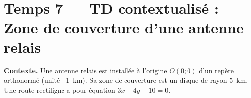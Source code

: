 
\section*{Temps 7 — TD contextualisé : Zone de couverture d'une antenne relais}

\textbf{Contexte.} Une antenne relais est installée à l'origine $O(0 ; 0)$ d'un repère orthonormé (unité : 1~km). Sa zone de couverture est un disque de rayon $5$~km. Une route rectiligne a pour équation $3x - 4y - 10 = 0$.

\bigskip


